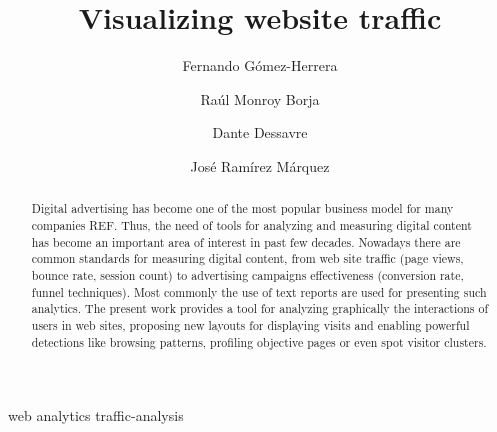 \documentclass[preprint,12pt,3p]{elsarticle}
\begin{document}
\begin{frontmatter}
\title{Visualizing website traffic}

\author[label1]{Fernando G\'{o}mez-Herrera}
\address[label1]{Instituto Tecnol\'{o}gico y de Estudios Superiores de Monterrey (ITESM)}
\author[label1]{Ra\'{u}l Monroy Borja}

\author[label2]{Dante Dessavre}
\author[label2]{Jos\'{e} Ram\'{i}rez M\'{a}rquez}
\address[label2]{Stevens Institute of Technology (Stevens)}



\begin{abstract}
Digital advertising has become one of the most popular business model for many companies REF. Thus, the need of tools for analyzing and measuring digital content has become an important area of interest in past few decades. Nowadays there are common standards for measuring digital content, from web site traffic (page views, bounce rate, session count) to advertising campaigns effectiveness (conversion rate, funnel techniques). Most commonly the use of text reports are used for presenting such analytics. The present work provides a tool for analyzing graphically the interactions of users in web sites, proposing new layouts for displaying visits and enabling powerful detections like browsing patterns, profiling objective pages or even spot visitor clusters.
\end{abstract}

\begin{keyword}
web analytics traffic-analysis
\end{keyword}

\end{frontmatter}


\end{document}
